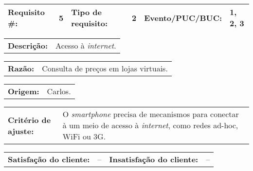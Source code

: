
\par \noindent
\begin{table}[h]
    \begin{tabularx}{\textwidth}{
        p{}
        p{}
        p{}
        p{}
        p{}
        p{}
    }
    \toprule
        \textbf{Requisito \#:}          & 5
        & \textbf{Tipo de requisito:}   & 2
        & \textbf{Evento/PUC/BUC:}      & 1, 2, 3 \\
    \midrule
    \end{tabularx}
    \vspace{5pt}
    \begin{tabularx}{\textwidth}{p{}  p{}}
        \textbf{Descrição:} &
        Acesso à \emph{internet}. 
    \end{tabularx}
    
    \vspace{5pt}
    \begin{tabularx}{\textwidth}{p{}  p{}}
        \textbf{Razão:} &
        Consulta de preços em lojas virtuais.
    \end{tabularx}
    
    \vspace{5pt}
    \begin{tabularx}{\textwidth}{p{} p{}}
        \textbf{Origem:} &
        Carlos.
    \end{tabularx}
    
    \vspace{5pt}
    \begin{tabularx}{\textwidth}{p{} p{}}
        \textbf{Critério de ajuste:} &
        O \emph{smartphone} precisa de mecanismos para conectar à
        um meio de acesso à \emph{internet}, como redes ad-hoc,
        WiFi ou 3G.
    \end{tabularx}
    
    \vspace{5pt}
    \begin{tabularx}{\textwidth}{p{}p{}
                                 p{}p{}}
        \textbf{Satisfação do cliente:} & --& 
        \textbf{Insatisfação do cliente:} & --
    \end{tabularx}
    

\end{table}
